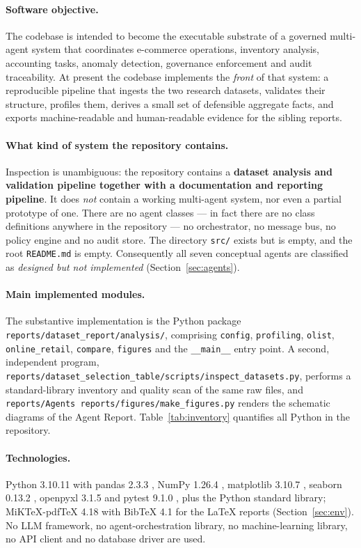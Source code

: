 \documentclass[11pt,a4paper]{article}
\newcommand{\code}[1]{\texttt{#1}}
\begin{document}
\paragraph{Software objective.} The codebase is intended to become the executable substrate of a governed multi-agent system \cite{wooldridge2009,shoham2009,russellNorvig2021} that coordinates e-commerce operations, inventory analysis, accounting tasks, anomaly detection, governance enforcement and audit traceability. At present the codebase implements the \emph{front} of that system: a reproducible pipeline that ingests the two research datasets, validates their structure, profiles them, derives a small set of defensible aggregate facts, and exports machine-readable and human-readable evidence for the sibling reports.

\paragraph{What kind of system the repository contains.} Inspection is unambiguous: the repository contains a \textbf{dataset analysis and validation pipeline together with a documentation and reporting pipeline}. It does \emph{not} contain a working multi-agent system, nor even a partial prototype of one. There are no agent classes --- in fact there are no class definitions anywhere in the repository --- no orchestrator, no message bus, no policy engine and no audit store. The directory \code{src/} exists but is empty, and the root \code{README.md} is empty. Consequently all seven conceptual agents are classified as \emph{designed but not implemented} (Section~\ref{sec:agents}).

\paragraph{Main implemented modules.} The substantive implementation is the Python package \code{reports/dataset\_report/analysis/}, comprising \code{config}, \code{profiling}, \code{olist}, \code{online\_retail}, \code{compare}, \code{figures} and the \code{\_\_main\_\_} entry point. A second, independent program, \code{reports/dataset\_selection\_table/scripts/inspect\_datasets.py}, performs a standard-library inventory and quality scan of the same raw files, and \code{reports/Agents reports/figures/make\_figures.py} renders the schematic diagrams of the Agent Report. Table~\ref{tab:inventory} quantifies all Python in the repository.

\paragraph{Technologies.} Python 3.10.11 \cite{pythonDocs} with pandas 2.3.3 \cite{mckinney2010,pandasDocs}, NumPy 1.26.4 \cite{harris2020numpy,numpyDocs}, matplotlib 3.10.7 \cite{hunter2007matplotlib,matplotlibDocs}, seaborn 0.13.2 \cite{waskom2021seaborn,seabornDocs}, openpyxl 3.1.5 \cite{openpyxlDocs} and pytest 9.1.0 \cite{pytestDocs}, plus the Python standard library; MiKTeX-pdfTeX 4.18 with BibTeX 4.1 \cite{miktexDocs} for the LaTeX reports (Section~\ref{sec:env}). No LLM framework, no agent-orchestration library, no machine-learning library, no API client and no database driver are used.
\end{document}
